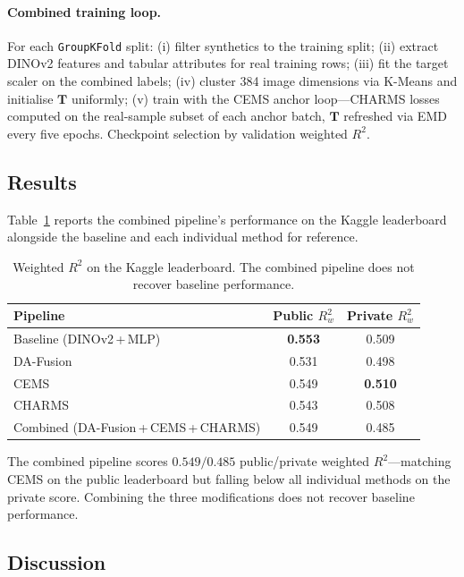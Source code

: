 \documentclass[10pt, a4paper]{article}
\begin{document}
\paragraph{Combined training loop.}
For each \texttt{GroupKFold} split: (i) filter synthetics to the training
split; (ii) extract DINOv2 features and tabular attributes for real training
rows; (iii) fit the target scaler on the combined labels; (iv) cluster 384
image dimensions via K-Means and initialise $\mathbf{T}$ uniformly;
(v) train with the CEMS anchor loop---CHARMS losses computed on the
real-sample subset of each anchor batch, $\mathbf{T}$ refreshed via EMD every
five epochs. Checkpoint selection by validation weighted $R^{2}$.

\subsection{Results}
\label{sec:combined-results}

Table~\ref{tab:combined-results} reports the combined pipeline's performance
on the Kaggle leaderboard alongside the baseline and each individual method
for reference.

\begin{table}[h]
\centering
\small
\begin{tabular}{lcc}
\toprule
Pipeline & Public $R^{2}_{w}$ & Private $R^{2}_{w}$ \\
\midrule
Baseline (DINOv2\,+\,MLP)            & \textbf{0.553}& 0.509\\
DA-Fusion                            & 0.531 & 0.498 \\
CEMS                                 & 0.549& \textbf{0.510}\\
CHARMS                               & 0.543& 0.508\\
\midrule
Combined (DA-Fusion\,+\,CEMS\,+\,CHARMS) & 0.549& 0.485\\
\bottomrule
\end{tabular}
\caption{Weighted $R^{2}$ on the Kaggle leaderboard. The combined pipeline
does not recover baseline performance.}
\label{tab:combined-results}
\end{table}

The combined pipeline scores $0.549 / 0.485$ public/private weighted $R^{2}$---matching
CEMS on the public leaderboard but falling below all individual methods on the private
score. Combining the three modifications does not recover baseline performance.

\subsection{Discussion}
\label{sec:combined-discussion}
\end{document}
